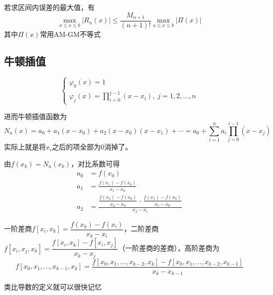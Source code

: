 若求区间内误差的最大值，有
\[\max_{a\leq x\leq b}|R_n(x)|\leq\frac{M_{n+1}}{(n+1)!}\max_{a\leq x\leq b}|\Pi(x)|\]
其中$\Pi(x)$常用AM-GM不等式

\subsection{牛顿插值}
\begin{definition}[牛顿插值基函数]
\[\begin{cases}
\varphi_0(x)=1\\
\varphi_j(x)=\displaystyle\prod_{i=0}^{j-1}(x-x_i),\;j=1,2,\ldots,n
\end{cases}\]
\end{definition}
\par 进而牛顿插值函数为
\[N_n(x)=a_0+a_1(x-x_0)+a_2(x-x_0)(x-x_1)+\cdots=a_0+\sum_{i=1}^na_i\prod_{j=0}^{i-1}(x-x_j)\]
实际上就是将$x_i$之后的项全部为$0$消掉了。
\par 由$f(x_k)=N_n(x_k)$，对比系数可得
\[\begin{aligned}
a_0 &=f(x_0)\\
a_1 &=\frac{f(x_1)-f(x_0)}{x_1-x_0}\\
a_2 &=\frac{\dfrac{f(x_2)-f(x_0)}{x_2-x_0}-\dfrac{f(x_1)-f(x_0)}{x_1-x_0}}{x_2-x_1}
\end{aligned}\]

\begin{definition}[差商]
一阶差商$f[x_i,x_k]=\dfrac{f(x_k)-f(x_i)}{x_k-x_i}$，二阶差商$f[x_i,x_j,x_k]=\dfrac{f[x_i,x_k]-f[x_i,x_j]}{x_k-x_j}$（一阶差商的差商），高阶差商为
\[f[x_0,x_1,\ldots,x_{k-1},x_k]=\frac{f[x_0,x_1,\ldots,x_{k-2},x_k]-f[x_0,x_1,\ldots,x_{k-2},x_{k-1}]}{x_k-x_{k-1}}\]
\end{definition}
类比导数的定义就可以很快记忆


